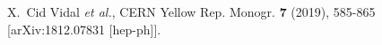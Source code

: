 \documentclass[12pt]{article}
\begin{document}


\newcommand\jnl[1]{\textit{\frenchspacing #1}}
\newcommand\vol[1]{\textbf{#1}}

\begin{thebibliography}{100}

%

X.~Cid Vidal \textit{et al.}, 
CERN Yellow Rep. Monogr. \textbf{7} (2019), 585-865
[arXiv:1812.07831 [hep-ph]].



\end{thebibliography}



\newpage{\pagestyle{empty}\cleardoublepage}

\end{document}
